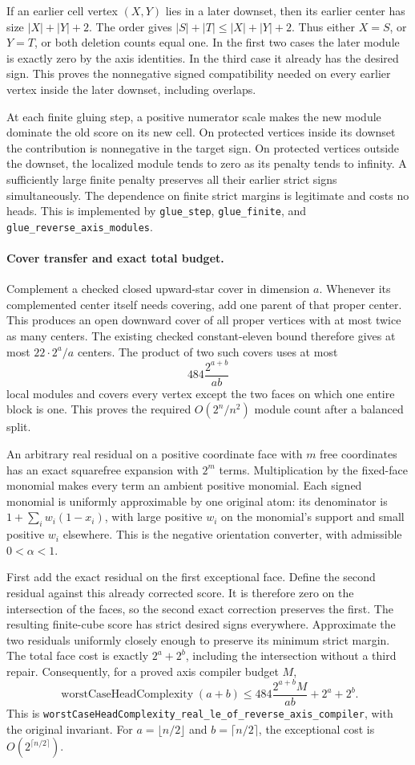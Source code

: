 \documentclass[11pt]{article}
\newcommand{\W}{\operatorname{worstCaseHeadComplexity}}
\begin{document}
If an earlier cell vertex $(X,Y)$ lies in a later downset, then its
earlier center has size $|X|+|Y|+2$.  The order gives
$|S|+|T|\leq|X|+|Y|+2$.  Thus either $X=S$, or $Y=T$, or both deletion
counts equal one.  In the first two cases the later module is exactly
zero by the axis identities.  In the third case it already has the
desired sign.  This proves the nonnegative signed compatibility needed
on every earlier vertex inside the later downset, including overlaps.

At each finite gluing step, a positive numerator scale makes the new
module dominate the old score on its new cell.  On protected vertices
inside its downset the contribution is nonnegative in the target sign.
On protected vertices outside the downset, the localized module tends
to zero as its penalty tends to infinity.  A sufficiently large finite
penalty preserves all their earlier strict signs simultaneously.
The dependence on finite strict margins is legitimate and costs no
heads.  This is implemented by \texttt{glue\_step},
\texttt{glue\_finite}, and \texttt{glue\_reverse\_axis\_modules}.

\paragraph{Cover transfer and exact total budget.}
Complement a checked closed upward-star cover in dimension $a$.
Whenever its complemented center itself needs covering, add one parent
of that proper center.  This produces an open downward cover of all
proper vertices with at most twice as many centers.  The existing
checked constant-eleven bound therefore gives at most
$22\cdot2^a/a$ centers.  The product of two such covers uses at most
\[
 484\frac{2^{a+b}}{ab}
\]
local modules and covers every vertex except the two faces on which
one entire block is one.  This proves the required
$O(2^n/n^2)$ module count after a balanced split.

An arbitrary real residual on a positive coordinate face with $m$
free coordinates has an exact squarefree expansion with $2^m$ terms.
Multiplication by the fixed-face monomial makes every term an ambient
positive monomial.  Each signed monomial is uniformly approximable by
one original atom: its denominator is
$1+\sum_i w_i(1-x_i)$, with large positive $w_i$ on the monomial's
support and small positive $w_i$ elsewhere.  This is the negative
orientation converter, with admissible $0<\alpha<1$.

First add the exact residual on the first exceptional face.  Define
the second residual against this already corrected score.  It is
therefore zero on the intersection of the faces, so the second exact
correction preserves the first.  The resulting finite-cube score has
strict desired signs everywhere.  Approximate the two residuals
uniformly closely enough to preserve its minimum strict margin.
The total face cost is exactly $2^a+2^b$, including the intersection
without a third repair.  Consequently, for a proved axis compiler
budget $M$,
\[
 \W(a+b)\leq484\frac{2^{a+b}M}{ab}+2^a+2^b.
\]
This is \texttt{worstCaseHeadComplexity\_real\_le\_of\_reverse\_axis\_compiler},
with the original invariant.  For $a=\lfloor n/2\rfloor$ and
$b=\lceil n/2\rceil$, the exceptional cost is
$O(2^{\lceil n/2\rceil})$.
\end{document}

